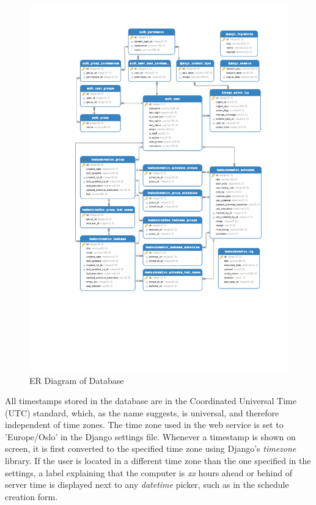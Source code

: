 \begin{figure}[p]
    \centering
    \includegraphics[width=\textwidth,height=\textheight]{figures/er_diagram.pdf}
    \caption{ER Diagram of Database}
    \label{fig.db_er}
\end{figure}

All timestamps stored in the database are in the Coordinated Universal Time (UTC) standard, which, as the name suggests, is universal, and therefore independent of time zones. The time zone used in the web service is set to 'Europe/Oslo' in the Django settings file. Whenever a timestamp is shown on screen, it is first converted to the specified time zone using Django's \emph{timezone} library. If the user is located in a different time zone than the one specified in the settings, a label explaining that the computer is \emph{xx} hours ahead or behind of server time is displayed next to any \emph{datetime} picker, such as in the schedule creation form.

